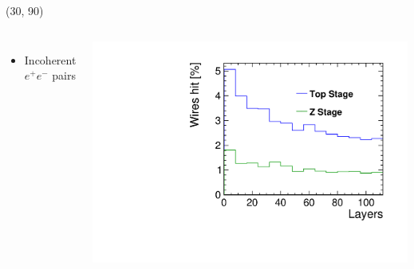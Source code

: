 \documentclass[final,xcolor={dvipsnames,svgnames,x11names,table}]{beamer}
\begin{document}
\begin{frame}
\begin{textblock}{40}
\begin{tcolorbox}[title=Main sources of beam-induced backgrounds]
  \end{tcolorbox}
\end{textblock}

%
%
%

\begin{textblock}{50}(30, 90)
  \begin{tcolorbox}[title=3 main sources of beam-induced backgrounds at the top stage]

  \begin{columns}
    \begin{itemize}
      \item Incoherent $e^+e^-$ pairs
    \end{itemize}
    \centering
    \includegraphics[width=\textwidth]{Figures/incoherent_top_Z.pdf}


\end{columns}
\end{tcolorbox}
\end{textblock}
\end{frame}
\end{document}
